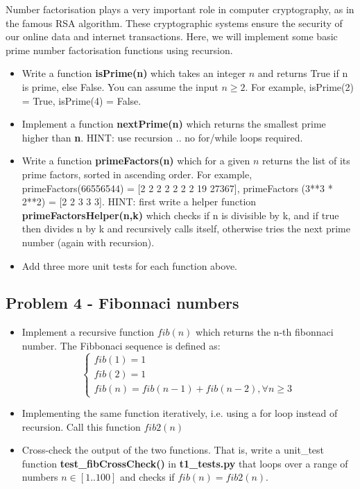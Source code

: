 \documentclass[11pt,a4paper]{report}
\begin{document}
Number factorisation plays a very important role in computer cryptography, as in the famous RSA algorithm. These cryptographic systems ensure the security of our online data and internet transactions. Here, we will implement some basic prime number factorisation functions using recursion. 

\begin{itemize}
 \item Write a function \textbf{isPrime(n)} which takes an integer $n$ and returns True if n is prime, else False. You can assume the input $n \ge 2$. For example, isPrime(2) = True, isPrime(4) = False. 
 \item Implement a function \textbf{nextPrime(n)} which returns the smallest prime higher than \textbf{n}. HINT: use recursion .. no for/while loops required.
 \item Write a function \textbf{primeFactors(n)} which for a given $n$ returns the list of its prime factors, sorted in ascending order. For example, primeFactors(66556544) = [2 2 2 2 2 2 2 19 27367], primeFactors (3**3 * 2**2) = [2 2 3 3 3]. HINT: first write a helper function \textbf{primeFactorsHelper(n,k)} which checks if n is divisible by k, and if true then divides n by k and recursively calls itself, otherwise tries the next prime number (again with recursion).  
 \item Add three more unit tests for each function above.
\end{itemize}

\subsection*{Problem 4  - Fibonnaci numbers}

\begin{itemize}
 \item Implement a recursive function $fib(n)$ which returns the n-th fibonnaci number. The Fibbonaci sequence is defined as:
$$\begin{cases}
fib(1) = 1\\
fib(2) = 1\\
fib(n) = fib(n-1) + fib(n-2), \forall n \ge 3
\end{cases} $$
 \item Implementing the same function iteratively, i.e. using a for loop instead of recursion. Call this function $fib2(n)$
 \item Cross-check the output of the two functions. That is, write a unit\_test function \textbf{test\_fibCrossCheck()} in \textbf{t1\_tests.py} that loops over a range of numbers $n \in [1 .. 100]$ and checks if $fib(n) = fib2(n)$.
\end{itemize}
\end{document}
